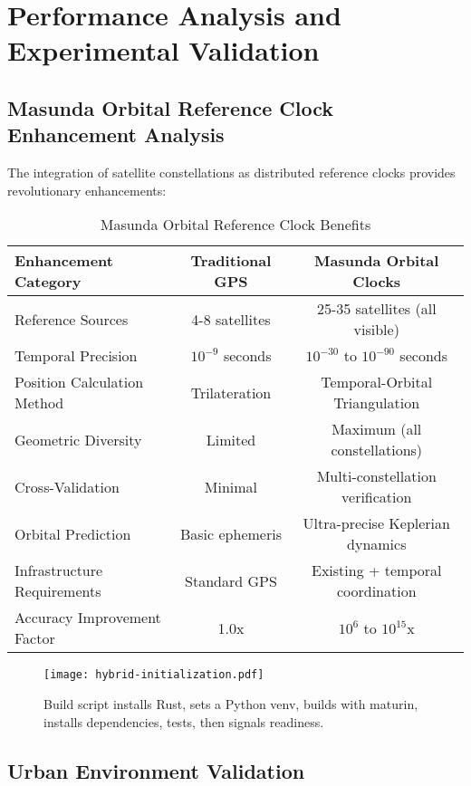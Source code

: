 \documentclass[12pt,a4paper]{article}
\begin{document}
\section{Performance Analysis and Experimental Validation}


\subsection{Masunda Orbital Reference Clock Enhancement Analysis}

The integration of satellite constellations as distributed reference clocks provides revolutionary enhancements:

\begin{table}[htbp]
\centering
\caption{Masunda Orbital Reference Clock Benefits}
\begin{tabular}{@{}lcc@{}}
\toprule
\textbf{Enhancement Category} & \textbf{Traditional GPS} & \textbf{Masunda Orbital Clocks} \\
\midrule
Reference Sources & 4-8 satellites & 25-35 satellites (all visible) \\
Temporal Precision & $10^{-9}$ seconds & $10^{-30}$ to $10^{-90}$ seconds \\
Position Calculation Method & Trilateration & Temporal-Orbital Triangulation \\
Geometric Diversity & Limited & Maximum (all constellations) \\
Cross-Validation & Minimal & Multi-constellation verification \\
Orbital Prediction & Basic ephemeris & Ultra-precise Keplerian dynamics \\
Infrastructure Requirements & Standard GPS & Existing + temporal coordination \\
Accuracy Improvement Factor & 1.0x & $10^{6}$ to $10^{15}$x \\
\bottomrule
\end{tabular}
\end{table}

\begin{figure}[H]
\centering
\texttt{[image: hybrid-initialization.pdf]}
\caption{Build script installs Rust, sets a Python venv, builds with maturin, installs dependencies, tests, then signals readiness.}
\label{fig:hybrid-initialization}
\end{figure}

\subsection{Urban Environment Validation}
\end{document}
